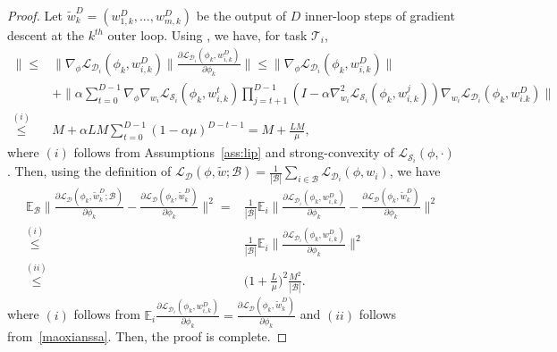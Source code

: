 \documentclass{osudissert96}
\def\gB{{\mathcal{B}}}
\def\gD{{\mathcal{D}}}
\def\gL{{\mathcal{L}}}
\def\gS{{\mathcal{S}}}
\def\gT{{\mathcal{T}}}
\begin{document}
\begin{proof}
Let $\widetilde w_k^{D}=(w_{1,k}^D,...,w_{m,k}^D)$ be the output of $D$ inner-loop steps of gradient descent at the $k^{th}$ outer loop. 
Using , we have, for task $\gT_i$,
\begin{align}\label{maoxianssa}
\Big\|\leq & \|\nabla_\phi  \gL_{\gD_i}(\phi_k,w_{i,k}^D)\|\frac{\partial \gL_{\gD_i}(\phi_k,w^D_{i,k})}{\partial \phi_k} \Big\|\leq  \|\nabla_\phi  \gL_{\gD_i}(\phi_k,w_{i,k}^D)\| \nonumber
\\&+ \Big\|\alpha\sum_{t=0}^{D-1}\nabla_\phi\nabla_{w_i}  \gL_{\gS_i}(\phi_k,w_{i,k}^{t})\prod_{j=t+1}^{D-1}(I-\alpha  \nabla^2_{w_i}  \gL_{\gS_i}(\phi_k,w_{i,k}^{j}))\nabla_{w_i}  \gL_{\gD_i}(\phi_k,w_{i.k}^D)\Big\| \nonumber
\\\overset{(i)}\leq& M + \alpha LM\sum_{t=0}^{D-1} (1-\alpha\mu)^{D-t-1} = M+\frac{LM}{\mu},
\end{align} 
where $(i)$ follows from Assumptions~\ref{ass:lip} and strong-convexity of $ \gL_{\gS_i}(\phi,\cdot)$. Then, using the definition of $ \gL_{\gD} (\phi,\widetilde w;\gB) = \frac{1}{|\gB|}\sum_{i\in\gB}\gL_{\gD_i}(\phi,w_i)$, we have 
\begin{align}
\mathbb{E}_\gB\Big\|\frac{\partial \gL_{\gD} (\phi_k, \widetilde w^D_k;\gB)}{\partial \phi_k} - \frac{\partial \gL_{\gD} (\phi_k, \widetilde w^D_k)}{\partial \phi_k} \Big\|^2 =& \frac{1}{|\gB|}\mathbb{E}_i\Big\|\frac{\partial \gL_{\gD_i}(\phi_k,w^D_{i,k})}{\partial \phi_k}  - \frac{\partial \gL_{\gD} (\phi_k, \widetilde w^D_k)}{\partial \phi_k} \Big\|^2 \nonumber
\\\overset{(i)}\leq&\frac{1}{|\gB|} \mathbb{E}_i \Big\|\frac{\partial \gL_{\gD_i}(\phi_k,w^D_{i,k})}{\partial \phi_k} \Big\|^2 \nonumber
\\\overset{(ii)}\leq& \Big(1+\frac{L}{\mu}\Big)^2\frac{M^2}{|\gB|}.
\end{align}
where $(i)$ follows from $\mathbb{E}_i \frac{\partial \gL_{\gD_i}(\phi_k,w^D_{i,k})}{\partial \phi_k}=\frac{\partial \gL_{\gD} (\phi_k, \widetilde w^D_k)}{\partial \phi_k}  $ and $(ii)$ follows from~\cref{maoxianssa}. Then, the proof is complete.
\end{proof}
\end{document}
